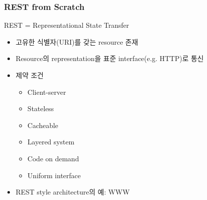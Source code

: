 \begin{frame}[fragile]
\frametitle{REST from Scratch}

\begin{center}
REST = Representational State Transfer
\end{center}

\begin{itemize}
\item 고유한 식별자(URI)를 갖는 resource 존재
\item Resource의 representation을 표준 interface(e.g. HTTP)로 통신
\item 제약 조건
\begin{itemize}
\item Client-server
\item Stateless
\item Cacheable
\item Layered system
\item Code on demand
\item Uniform interface
\end{itemize}
\item REST style architecture의 예: WWW
\end{itemize}


\end{frame}

